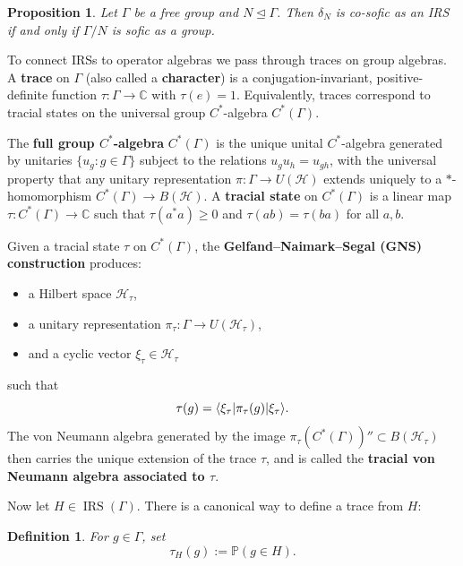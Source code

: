 \documentclass[pdflatex,sn-mathphys-num]{sn-jnl}%
\newtheorem{proposition}[theorem]{Proposition}
\newtheorem{definition}[theorem]{Definition}
\DeclarePairedDelimiter\bra{\langle}{\rvert}
\DeclarePairedDelimiter\ket{\lvert}{\rangle}
\newcommand{\IRS}{\operatorname{IRS}}
\begin{document}
\begin{proposition}\cite[Lemma 16]{abert_rank_2017}\label{prop:1.14}
    Let $\Gamma$ be a free group and $N \trianglelefteq \Gamma$.  
    Then $\delta_N$ is co-sofic as an IRS if and only if $\Gamma/N$ is sofic as a group.
\end{proposition}

\medskip

To connect IRSs to operator algebras we pass through traces on group algebras.  
A \textbf{trace} on $\Gamma$ (also called a \textbf{character}) is a conjugation-invariant, positive-definite function $\tau \colon \Gamma \to \mathbb{C}$ with $\tau(e)=1$.  
Equivalently, traces correspond to tracial states on the universal group $C^*$-algebra $C^*(\Gamma)$.

    The \textbf{full group $C^*$-algebra} $C^*(\Gamma)$ is the unique unital $C^*$-algebra generated by unitaries $\{u_g : g \in \Gamma\}$ subject to the relations $u_g u_h = u_{gh}$, with the universal property that any unitary representation $\pi \colon \Gamma \to U(\mathcal{H})$ extends uniquely to a $*$-homomorphism $C^*(\Gamma)\to B(\mathcal{H})$.  
    A \textbf{tracial state} on $C^*(\Gamma)$ is a linear map $\tau:C^*(\Gamma)\to \mathbb{C}$ such that $\tau(a^*a)\geq 0$ and $\tau(ab)=\tau(ba)$ for all $a,b$.

Given a tracial state $\tau$ on $C^*(\Gamma)$, the \textbf{Gelfand–Naimark–Segal (GNS) construction} produces:
\begin{itemize}
    \item a Hilbert space $\mathcal{H}_\tau$,
    \item a unitary representation $\pi_\tau : \Gamma \to U(\mathcal{H}_\tau)$,
    \item and a cyclic vector $\xi_\tau \in \mathcal{H}_\tau$
\end{itemize}
such that 
\[
    \tau(g) = \bra{\xi_\tau}\pi_\tau(g)\ket{\xi_\tau}.
\]
The von Neumann algebra generated by the image $\pi_\tau(C^*(\Gamma))''\subset B(\mathcal{H}_\tau)$ then carries the unique extension of the trace $\tau$, and is called the \textbf{tracial von Neumann algebra associated to $\tau$}. 

\medskip

Now let $H \in \IRS(\Gamma)$.  
There is a canonical way to define a trace from $H$: 

\begin{definition}
    For $g \in \Gamma$, set
    \[
        \tau_H(g) := \mathbb{P}(g \in H).
    \]
\end{definition}
\end{document}
